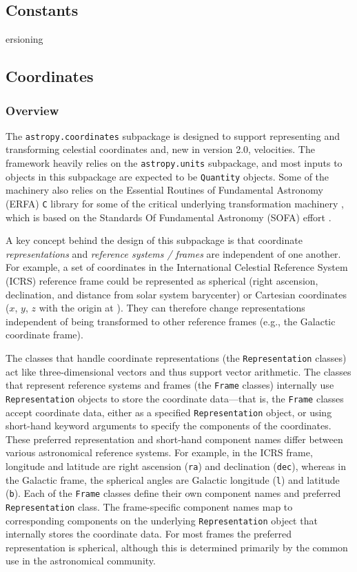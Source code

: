 \documentclass[modern]{aastex61}
\newcommand{\package}[1]{\texttt{#1}\xspace}
\newcommand{\inlinecomment}[2]{\todo[inline]{#1: #2}\xspace}
\begin{document}
\subsection{Constants}

\inlinecomment{David S.}

versioning


\subsection{Coordinates}
\label{sec:coordinates}

\subsubsection{Overview}
The \package{astropy.coordinates} subpackage is designed to support representing
and transforming celestial coordinates and, new in version 2.0, velocities.
The framework heavily relies on the \package{astropy.units} subpackage, and most
inputs to objects in this subpackage are expected to be \texttt{Quantity}
objects.
Some of the machinery also relies on the Essential Routines of Fundamental
Astronomy (ERFA) \texttt{C} library for some of the critical underlying
transformation machinery \citep{erfa}, which is based on the Standards Of 
Fundamental Astronomy (SOFA) effort \citep{sofa}.


A key concept behind the design of this subpackage is that coordinate
\textit{representations} and \textit{reference systems / frames} are independent
of one another.
For example, a set of coordinates in the International Celestial Reference
System (ICRS) reference frame could be represented as spherical (right
ascension, declination, and distance from solar system barycenter) or Cartesian
coordinates ($x$, $y$, $z$ with the origin at ).
They can therefore change representations independent of being transformed to
other reference frames (e.g., the Galactic coordinate frame).

The classes that handle coordinate representations (the \texttt{Representation}
classes) act like three-dimensional vectors and thus support vector arithmetic.
The classes that represent reference systems and frames (the \texttt{Frame}
classes) internally use \texttt{Representation} objects to store the coordinate
data---that is, the \texttt{Frame} classes accept coordinate data, either as a
specified \texttt{Representation} object, or using short-hand keyword arguments
to specify the components of the coordinates.
These preferred representation and short-hand component names differ between
various astronomical reference systems.
For example, in the ICRS frame, longitude and latitude are right ascension
(\texttt{ra}) and declination (\texttt{dec}), whereas in the Galactic frame, the
spherical angles are Galactic longitude (\texttt{l}) and latitude (\texttt{b}).
Each of the \texttt{Frame} classes define their own component names and
preferred \texttt{Representation} class.
The frame-specific component names map to corresponding components on the
underlying \texttt{Representation} object that internally stores the coordinate
data.
For most frames the preferred representation is spherical, although this is
determined primarily by the common use in the astronomical community.
\end{document}
